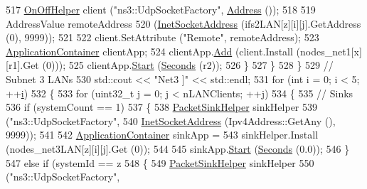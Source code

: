 \begin{DoxyCode}
517                       \hyperlink{classns3_1_1OnOffHelper}{OnOffHelper} client (\textcolor{stringliteral}{"ns3::UdpSocketFactory"}, 
      \hyperlink{classns3_1_1Address}{Address} ());
518 
519                       AddressValue remoteAddress
520                         (\hyperlink{classns3_1_1InetSocketAddress}{InetSocketAddress} (ifs2LAN[z][i][j].GetAddress (0), 9999));
521 
522                       client.SetAttribute (\textcolor{stringliteral}{"Remote"}, remoteAddress);
523                       \hyperlink{classns3_1_1ApplicationContainer}{ApplicationContainer} clientApp;
524                       clientApp.\hyperlink{classns3_1_1ApplicationContainer_ad09ab1a1ad5849d518d5f4c262e38152}{Add} (client.Install (nodes\_net1[x][r1].Get (0)));
525                       clientApp.\hyperlink{classns3_1_1ApplicationContainer_a8eff87926507020bbe3e1390358a54a7}{Start} (\hyperlink{group__timecivil_ga33c34b816f8ff6628e33d5c8e9713b9e}{Seconds} (r2));
526                     \}
527                 \}
528             \}
529           \textcolor{comment}{// Subnet 3 LANs}
530           std::cout << \textcolor{stringliteral}{"Net3 ]"} << std::endl;
531           \textcolor{keywordflow}{for} (\textcolor{keywordtype}{int} i = 0; i < 5; ++\hyperlink{bernuolliDistribution_8m_a6f6ccfcf58b31cb6412107d9d5281426}{i})
532             \{
533               \textcolor{keywordflow}{for} (uint32\_t j = 0; j < nLANClients; ++j)
534                 \{
535                   \textcolor{comment}{// Sinks}
536                   \textcolor{keywordflow}{if} (systemCount == 1)
537                     \{
538                       \hyperlink{classns3_1_1PacketSinkHelper}{PacketSinkHelper} sinkHelper
539                         (\textcolor{stringliteral}{"ns3::UdpSocketFactory"},
540                         \hyperlink{classns3_1_1InetSocketAddress}{InetSocketAddress} (Ipv4Address::GetAny (), 9999));
541 
542                       \hyperlink{classns3_1_1ApplicationContainer}{ApplicationContainer} sinkApp =
543                         sinkHelper.Install (nodes\_net3LAN[z][i][j].Get (0));
544 
545                       sinkApp.\hyperlink{classns3_1_1ApplicationContainer_a8eff87926507020bbe3e1390358a54a7}{Start} (\hyperlink{group__timecivil_ga33c34b816f8ff6628e33d5c8e9713b9e}{Seconds} (0.0));
546                     \}
547                   \textcolor{keywordflow}{else} \textcolor{keywordflow}{if} (systemId == z %
548                     \{
549                       \hyperlink{classns3_1_1PacketSinkHelper}{PacketSinkHelper} sinkHelper
550                         (\textcolor{stringliteral}{"ns3::UdpSocketFactory"},

\end{DoxyCode}
